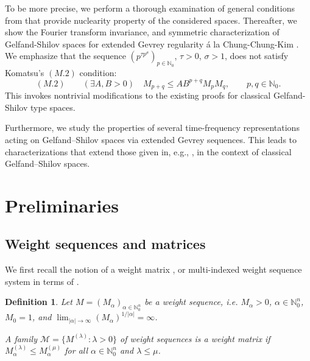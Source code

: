 \documentclass{article}
\theoremstyle{thmstyleone}
\theoremstyle{thmstyletwo}%
\theoremstyle{thmstylethree}%
\newtheorem{Definition}[Theorem]{Definition}%
\begin{document}
To be more precise, we perform a thorough examination of general conditions from \cite{DNV2021} that provide nuclearity property of the considered spaces. Thereafter, we show the Fourier transform invariance, and symmetric characterization of Gelfand-Shilov spaces for extended Gevrey regularity \'a la Chung-Chung-Kim \cite{Chung 1996}. We emphasize that the sequence
$(p^{\tau p^{\sigma} })_{p \in \mathbb{N}_0 }$, $\tau > 0$, $\sigma > 1$, does not satisfy Komatsu's $(M.2)$ condition:
\begin{equation*} \label{ultradiff-stability}
(M.2) \qquad (\exists A,B > 0) \quad M_{p+q}\leq AB^{p+q} M_p M_q,  \qquad p,q\in \mathbb N_0.
\end{equation*}
This invokes nontrivial modifications to the existing proofs for classical Gelfand-Shilov type spaces.

Furthermore, we study the properties of several time-frequency representations acting on Gelfand–Shilov spaces via extended Gevrey sequences. This leads to characterizations that extend those given in, e.g., \cite{GZ, Teo2018, Toft-2012}, in the context of classical Gelfand–Shilov spaces.

\section{Preliminaries}  \label{Sec2}

\subsection{Weight  sequences and matrices}

We first recall the notion of a weight matrix \cite{RS}, or multi-indexed weight sequence system in terms of \cite{DNV2021, DNV2024}.

\begin{Definition}
Let $M = ( M_{\alpha})_{\alpha\in \mathbb N_0 ^n}$ 
be a weight sequence, i.e. $M_{\alpha} >0$, $\alpha\in \mathbb N_0 ^n$,
$M_0 = 1$, and 
$ \lim_{|\alpha| \rightarrow \infty} (M_{\alpha})^{1/ |\alpha|} = \infty$.

A family 
$\mathcal{M} =\{ M ^{(\lambda)} \colon \lambda>0\}$ of weight sequences is a weight matrix if
$ M_{\alpha} ^{(\lambda)} \leq  M_{\alpha} ^{(\mu)} $ for all $\alpha\in \mathbb N_0 ^n$
and $\lambda \leq \mu$.    
\end{Definition} 
\end{document}
